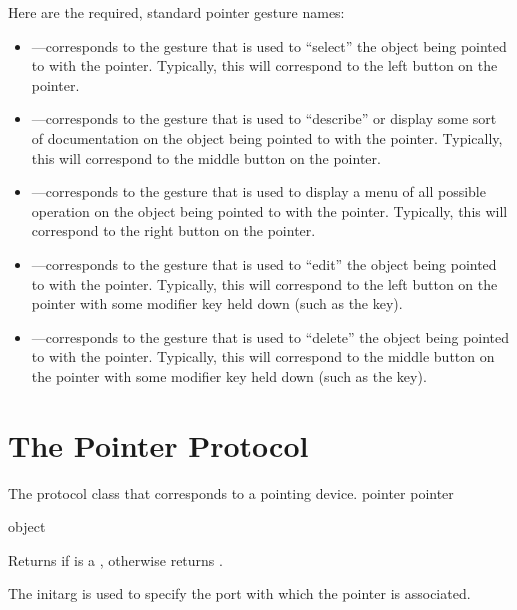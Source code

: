 Here are the required, standard pointer gesture names:

\begin{itemize}
\item{}---corresponds to the gesture that is used to ``select'' the
object being pointed to with the pointer.  Typically, this will correspond to
the left button on the pointer.

\item{}---corresponds to the gesture that is used to ``describe''
or display some sort of documentation on the object being pointed to with the
pointer.  Typically, this will correspond to the middle button on the pointer.

\item{}---corresponds to the gesture that is used to display a menu of
all possible operation on the object being pointed to with the pointer.
Typically, this will correspond to the right button on the pointer.

\item{}---corresponds to the gesture that is used to ``edit'' the
object being pointed to with the pointer.  Typically, this will correspond to
the left button on the pointer with some modifier key held down (such as the
 key).

\item{}---corresponds to the gesture that is used to ``delete'' the
object being pointed to with the pointer.  Typically, this will correspond to
the middle button on the pointer with some modifier key held down (such as the
 key).
\end{itemize}


\section {The Pointer Protocol}


The protocol class that corresponds to a pointing device.
 {pointer} {pointer}
\Mutable

 {object}

Returns  if  is a , otherwise returns
.


The  initarg is used to specify the port with which the pointer is
associated.


